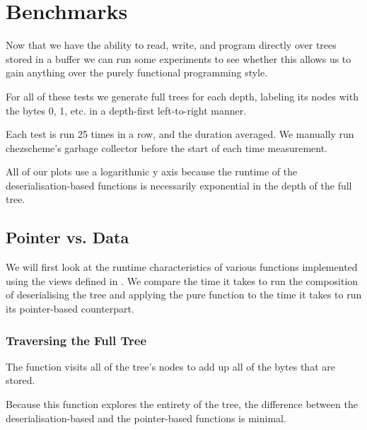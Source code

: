 


\section{Benchmarks}\label{sec:timing}

Now that we have the ability to read, write, and program directly
over trees stored in a buffer we can run some experiments to see
whether this allows us to gain anything over the purely functional
programming style.

For all of these tests we generate full trees for each depth,
labeling its nodes with the bytes 0, 1, etc. in a depth-first
left-to-right manner.

Each test is run 25 times in a row, and the duration averaged.
%
We manually run chezscheme's garbage collector before the start of
each time measurement.

All of our plots use a logarithmic y axis because the runtime of the
deserialisation-based functions is necessarily exponential in the depth
of the full tree.


\subsection{Pointer vs. Data}

We will first look at the runtime characteristics of various functions
implemented using the views defined in .
%
We compare the time it takes to run the composition of deserialising
the tree and applying the pure function to the time it takes to run
its pointer-based counterpart.

\subsubsection{Traversing the Full Tree}

The  function visits all of the tree's nodes to
add up all of the bytes that are stored.

\smallskip\noindent
\begin{minipage}{.5\textwidth}
\end{minipage}\hfill
\begin{minipage}{.45\textwidth}
\end{minipage}\smallskip

Because this function explores the entirety of the tree, the
difference between the deserialisation-based and the pointer-based
functions is minimal.

